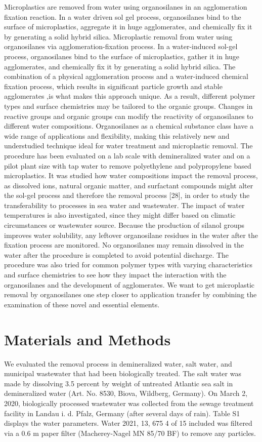 \documentclass[12pt]{article}
\begin{document}
Microplastics are removed from water using organosilanes in an agglomeration fixation reaction. In a water driven sol gel process, organosilanes bind to the surface of microplastics, aggregate it in huge agglomerates, and chemically fix it by generating a solid hybrid silica. Microplastic removal from water using organosilanes via agglomeration-fixation process. In a water-induced sol-gel process, organosilanes bind to the surface of microplastics, gather it in huge agglomerates, and chemically fix it by generating a solid hybrid silica. The combination of a physical agglomeration process and a water-induced chemical fixation process, which results in significant particle growth and stable agglomerates ,is what makes this approach unique.
As a result, different polymer types and surface chemistries may be tailored to the organic groups. Changes in reactive groups and organic groups can modify the reactivity of organosilanes to different water compositions. Organosilanes as a chemical substance class have a wide range of applications and flexibility, making this relatively new and understudied technique ideal for water treatment and microplastic removal. The procedure has been evaluated on a lab scale with demineralized water and on a pilot plant size with tap water to remove polyethylene and polypropylene based microplastics.
It was studied how water compositions impact the removal process, as dissolved ions, natural organic matter, and surfactant compounds might alter the sol-gel process and therefore the removal process [28], in order to study the transferability to processes in sea water and wastewater. The impact of water temperatures is also investigated, since they might differ based on climatic circumstances or wastewater source. Because the production of silanol groups improves water solubility, any leftover organosilane residues in the water after the fixation process are monitored.
No organosilanes may remain dissolved in the water after the procedure is completed to avoid potential discharge. The procedure was also tried for common polymer types with varying characteristics and surface chemistries to see how they impact the interaction with the organosilanes and the development of agglomerates. We want to get microplastic removal by organosilanes one step closer to application transfer by combining the examination of these novel and essential elements.

\clearpage
\section{Materials and Methods}
We evaluated the removal process in demineralized water, salt water, and municipal wastewater that had been biologically treated. The salt water was made by dissolving 3.5 percent by weight of untreated Atlantic sea salt in demineralized water (Art. No. 8530, Biova, Wildberg, Germany). On March 2, 2020, biologically processed wastewater was collected from the sewage treatment facility in Landau i. d. Pfalz, Germany (after several days of rain). Table S1 displays the water parameters. Water 2021, 13, 675 4 of 15 included was filtered via a 0.6 m paper filter (Macherey-Nagel MN 85/70 BF) to remove any particles.
\end{document}
